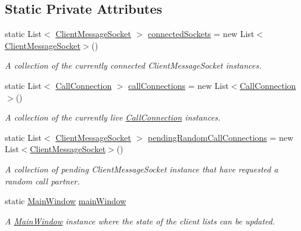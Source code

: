 \subsection*{Static Private Attributes}
\begin{DoxyCompactItemize}
\item 
static List$<$ \hyperlink{class_e_l_i_server_1_1_messaging_1_1_client_message_socket}{Client\+Message\+Socket} $>$ \hyperlink{class_e_l_i_server_1_1_message_socket_manager_a042e9dc087484feacc3128eb3f7ac2f4}{connected\+Sockets} = new List$<$\hyperlink{class_e_l_i_server_1_1_messaging_1_1_client_message_socket}{Client\+Message\+Socket}$>$()
\begin{DoxyCompactList}\small\item\em A collection of the currently connected Client\+Message\+Socket instances. \end{DoxyCompactList}\item 
static List$<$ \hyperlink{class_e_l_i_server_1_1_call_connection}{Call\+Connection} $>$ \hyperlink{class_e_l_i_server_1_1_message_socket_manager_a1f25b676369fa4e59beca49d3ecf294a}{call\+Connections} = new List$<$\hyperlink{class_e_l_i_server_1_1_call_connection}{Call\+Connection}$>$()
\begin{DoxyCompactList}\small\item\em A collection of the currently live \hyperlink{class_e_l_i_server_1_1_call_connection}{Call\+Connection} instances. \end{DoxyCompactList}\item 
static List$<$ \hyperlink{class_e_l_i_server_1_1_messaging_1_1_client_message_socket}{Client\+Message\+Socket} $>$ \hyperlink{class_e_l_i_server_1_1_message_socket_manager_ad145fe640e3a8f0af780441fc1d5221a}{pending\+Random\+Call\+Connections} = new List$<$\hyperlink{class_e_l_i_server_1_1_messaging_1_1_client_message_socket}{Client\+Message\+Socket}$>$()
\begin{DoxyCompactList}\small\item\em A collection of pending Client\+Message\+Socket instance that have requested a random call partner. \end{DoxyCompactList}\item 
static \hyperlink{class_e_l_i_server_1_1_main_window}{Main\+Window} \hyperlink{class_e_l_i_server_1_1_message_socket_manager_a937d0802b2bb8f1e173a17ee27e3b8cc}{main\+Window}
\begin{DoxyCompactList}\small\item\em A \hyperlink{class_e_l_i_server_1_1_main_window}{Main\+Window} instance where the state of the client lists can be updated. \end{DoxyCompactList}\end{DoxyCompactItemize}


